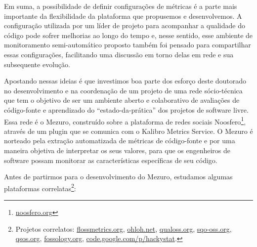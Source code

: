 Em suma, a possibilidade de definir configurações de métricas é a parte mais importante da flexibilidade
da plataforma que propusemos e desenvolvemos.
%
A configuração utilizada por um líder de projeto para acompanhar a qualidade
do código pode sofrer melhorias ao longo do tempo e, nesse sentido,
esse ambiente de monitoramento semi-automático proposto também foi pensado para
compartilhar essas configurações, facilitando uma discussão em torno delas em
rede e sua subsequente evolução.

Apostando nessas ideias é que investimos boa parte dos esforço deste doutorado
no desenvolvimento e na coordenação de um projeto de uma rede sócio-técnica que
tem o objetivo de ser um ambiente aberto e colaborativo de avaliações de
código-fonte e aprendizado do ``estado-da-prática'' dos projetos de software
livre.
%
Essa rede é o Mezuro, construído sobre a plataforma de redes sociais
Noosfero\footnote{\url{noosfero.org}}, através de um plugin que se comunica com
o Kalibro Metrics Service.
%
O Mezuro é norteado pela extração automatizada de métricas de
código-fonte e por uma maneira objetiva de interpretar os seus valores, para que
os engenheiros de software possam monitorar as características específicas de
seu código.

Antes de partirmos para o desenvolvimento do Mezuro, estudamos algumas
plataformas correlatas\footnote{Projetos correlatos:
  \url{flossmetrics.org},
  \url{ohloh.net},
  \url{qualoss.org},
  \url{sqo-oss.org},
  \url{qsos.org},
  \url{fossology.org},
  \url{code.google.com/p/hackystat}.
}:

